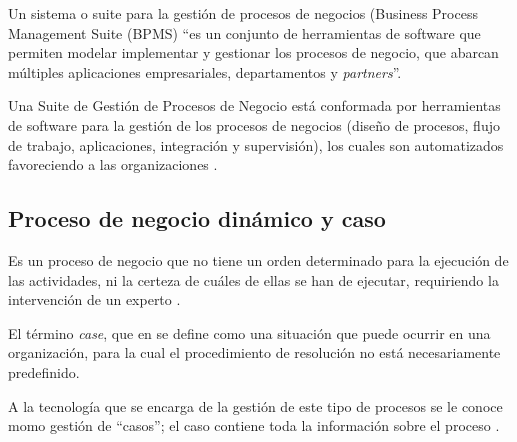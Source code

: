 Un sistema o suite para la gestión de procesos de negocios (Business Process Management Suite (BPMS) “es un conjunto de herramientas de software que permiten modelar implementar y gestionar los procesos de negocio, que abarcan múltiples aplicaciones empresariales, departamentos y \textit{partners}”\citep{smith2003business}.

Una Suite de Gestión de Procesos de Negocio está conformada por herramientas de software para la gestión de los procesos de negocios (diseño de procesos, flujo de trabajo, aplicaciones, integración y supervisión), los cuales son automatizados favoreciendo a las organizaciones \citep{underdahl2013gestion}.

\subsection{Proceso de negocio dinámico y caso}

Es un proceso de negocio que no tiene un orden determinado para la ejecución de las actividades, ni la certeza de cuáles de ellas se han de ejecutar, requiriendo la intervención de un experto \citep{hitpass2017bpmn}. 

El término \textit{case}, que en \cite{van2005case} se define como una situación que puede ocurrir en una organización, para la cual el procedimiento de resolución no está necesariamente predefinido.

A la tecnología que se encarga de la gestión de este tipo de procesos se le conoce momo gestión de “casos”; el caso contiene toda la información sobre el proceso \citep{marin2016introduction}.





